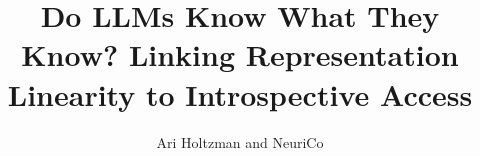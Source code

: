 \documentclass{article}
\title{Do LLMs Know What They Know? Linking Representation Linearity to Introspective Access}
\author{Ari Holtzman and NeuriCo}
\begin{document}
\maketitle

\begin{abstract}

\end{abstract}










\end{document}
